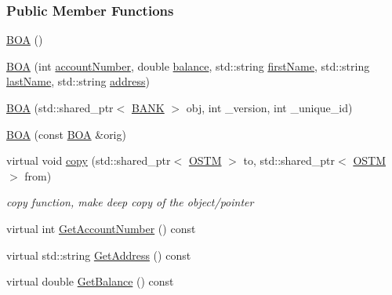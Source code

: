 \subsubsection*{Public Member Functions}
\begin{DoxyCompactItemize}
\item 
\hyperlink{class_b_o_a_ad42dc670d422172c9bcf9b3d354c8a3c_ad42dc670d422172c9bcf9b3d354c8a3c}{B\+OA} ()
\item 
\hyperlink{class_b_o_a_a898c8627b8976bbe1a7d0fc780642b25_a898c8627b8976bbe1a7d0fc780642b25}{B\+OA} (int \hyperlink{class_b_o_a_a86ca4ad716db205f04c337b39b34d9ba_a86ca4ad716db205f04c337b39b34d9ba}{account\+Number}, double \hyperlink{class_b_o_a_a2061c36a15924de9186ec5c83dc7da2f_a2061c36a15924de9186ec5c83dc7da2f}{balance}, std\+::string \hyperlink{class_b_o_a_acb1b3b2a69e403c4e0e3fb08fdbb52a0_acb1b3b2a69e403c4e0e3fb08fdbb52a0}{first\+Name}, std\+::string \hyperlink{class_b_o_a_ab7749e6e945beaca57a3ef01259c6fea_ab7749e6e945beaca57a3ef01259c6fea}{last\+Name}, std\+::string \hyperlink{class_b_o_a_afb2d7d0c5c05169a72bbc6f1d2cc737f_afb2d7d0c5c05169a72bbc6f1d2cc737f}{address})
\item 
\hyperlink{class_b_o_a_ab87192ed986e601c2eb682ea3745daf0_ab87192ed986e601c2eb682ea3745daf0}{B\+OA} (std\+::shared\+\_\+ptr$<$ \hyperlink{class_b_a_n_k}{B\+A\+NK} $>$ obj, int \+\_\+version, int \+\_\+unique\+\_\+id)
\item 
\hyperlink{class_b_o_a_a99ebf22a8d824761dc82e7e191e6f173_a99ebf22a8d824761dc82e7e191e6f173}{B\+OA} (const \hyperlink{class_b_o_a}{B\+OA} \&orig)
\item 
virtual void \hyperlink{class_b_o_a_a54fbcabb55b22fb72f45986768974403_a54fbcabb55b22fb72f45986768974403}{copy} (std\+::shared\+\_\+ptr$<$ \hyperlink{class_o_s_t_m}{O\+S\+TM} $>$ to, std\+::shared\+\_\+ptr$<$ \hyperlink{class_o_s_t_m}{O\+S\+TM} $>$ from)
\begin{DoxyCompactList}\small\item\em copy function, make deep copy of the object/pointer \end{DoxyCompactList}\item 
virtual int \hyperlink{class_b_o_a_ad64bd63675f8902153aa6767994f05dc_ad64bd63675f8902153aa6767994f05dc}{Get\+Account\+Number} () const 
\item 
virtual std\+::string \hyperlink{class_b_o_a_aa4aa2cf1ef0e876bb7911c00b5374493_aa4aa2cf1ef0e876bb7911c00b5374493}{Get\+Address} () const 
\item 
virtual double \hyperlink{class_b_o_a_a07e30b7e5f5f20392b94af7344fd550c_a07e30b7e5f5f20392b94af7344fd550c}{Get\+Balance} () const 

\end{DoxyCompactItemize}
